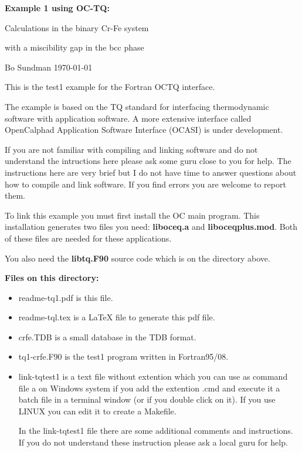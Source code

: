 \documentclass[12pt]{article}
\begin{document}
\begin{center}
{\Large \bf Example 1 using OC-TQ:

Calculations in the binary Cr-Fe  system

with a miscibility gap in the bcc phase

}

\bigskip

Bo Sundman \today

\end{center}

This is the test1 example for the Fortran OCTQ interface.

The example is based on the TQ standard for interfacing thermodynamic
software with application software.  A more extensive interface called
OpenCalphad Application Software Interface (OCASI) is under
development.

If you are not familiar with compiling and linking software and do not
understand the intructions here please ask some guru close to you for
help.  The instructions here are very brief but I do not have time to
answer questions about how to compile and link software.  If you find
errors you are welcome to report them.

To link this example you must first install the OC main program.  This
installation generates two files you need: {\bf liboceq.a} and {\bf
  liboceqplus.mod}.  Both of these files are needed for these
applications.

You also need the {\bf libtq.F90} source code which is on the
directory above.

\bigskip

{\bf Files on this directory:}
\begin{itemize}
\item readme-tq1.pdf is this file.

\item readme-tql.tex is a LaTeX file to generate this pdf file.

\item crfe.TDB is a small database in the TDB format.

\item tq1-crfe.F90 is the test1 program written in Fortran95/08.

\item link-tqtest1 is a text file without extention which you can use
  as command file a on Windows system if you add the extention .cmd
  and execute it a batch file in a terminal window (or if you double
  click on it).  If you use LINUX you can edit it to create a
  Makefile.

  In the link-tqtest1 file there are some additional comments and
  instructions.  If you do not understand these instruction please ask
  a local guru for help.
\end{itemize}
\end{document}
